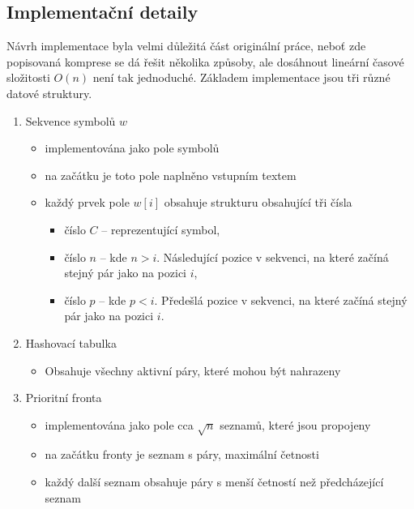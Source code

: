 \documentclass[a4paper,12pt]{article}
\begin{document}
\subsection{Implementační detaily}
Návrh implementace byla velmi důležitá část originální práce, neboť zde popisovaná komprese se dá řešit několika způsoby, ale dosáhnout lineární časové složitosti $O(n)$ není tak jednoduché. Základem implementace jsou tři různé datové struktury.
\begin{enumerate}
    \item Sekvence symbolů $w$
    \begin{itemize}
        \item implementována jako pole symbolů
        \item na začátku je toto pole naplněno vstupním textem
        \item každý prvek pole $w[i]$ obsahuje strukturu obsahující tři čísla
        \begin{itemize}
            \item číslo $C$ -- reprezentující symbol,
            \item číslo $n$ -- kde $n > i$. Následující pozice v sekvenci, na které začíná stejný pár jako na pozici $i$,
            \item číslo $p$ -- kde $p < i$. Předešlá pozice v sekvenci, na které začíná stejný pár jako na pozici $i$.
        \end{itemize}
    \end{itemize}
    \item Hashovací tabulka
    \begin{itemize}
        \item Obsahuje všechny aktivní páry, které mohou být nahrazeny
    \end{itemize}
    \item Prioritní fronta
    \begin{itemize}
        \item implementována jako pole cca $\sqrt{n}$ seznamů, které jsou propojeny
        \item na začátku fronty je seznam s páry, maximální četnosti
        \item každý další seznam obsahuje páry s menší četností než předcházející seznam
    \end{itemize}
\end{enumerate}
\end{document}
